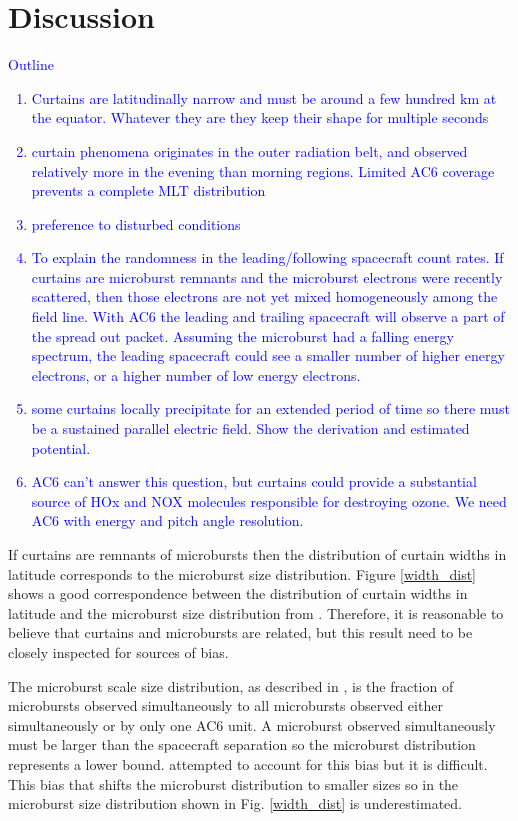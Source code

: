 \documentclass[draft]{agujournal2019}
\begin{document}
\section{Discussion} \label{discussion}
\textcolor{blue}{
Outline
\begin{enumerate}
\item Curtains are latitudinally narrow and must be around a few hundred km at the equator. Whatever they are they keep their shape for multiple seconds
\item curtain phenomena originates in the outer radiation belt, and observed relatively more in the evening than morning regions. Limited AC6 coverage prevents a complete MLT distribution
\item preference to disturbed conditions
\item To explain the randomness in the leading/following spacecraft count rates. If curtains are microburst remnants and the microburst electrons were recently scattered, then those electrons are not yet mixed homogeneously among the field line. With AC6 the leading and trailing spacecraft will observe a part of the spread out packet. Assuming the microburst had a falling energy spectrum, the leading spacecraft could see a smaller number of higher energy electrons, or a higher number of low energy electrons.
\item some curtains locally precipitate for an extended period of time so there must be a sustained parallel electric field. Show the derivation and estimated potential.
\item AC6 can't answer this question, but curtains could provide a substantial source of HOx and NOX molecules responsible for destroying ozone. We need AC6 with energy and pitch angle resolution.
\end{enumerate}}

If curtains are remnants of microbursts then the distribution of curtain widths in latitude corresponds to the microburst size distribution. Figure \ref{width_dist} shows a good correspondence between the distribution of curtain widths in latitude and the microburst size distribution from . Therefore, it is reasonable to believe that curtains and microbursts are related, but this result need to be closely inspected for sources of bias. 

The microburst scale size distribution, as described in , is the fraction of microbursts observed simultaneously to all microbursts observed either simultaneously or by only one AC6 unit. A microburst observed simultaneously must be larger than the spacecraft separation so the microburst distribution represents a lower bound.  attempted to account for this bias but it is difficult. This bias that shifts the microburst distribution to smaller sizes so in the microburst size distribution shown in Fig. \ref{width_dist} is underestimated.
\end{document}
